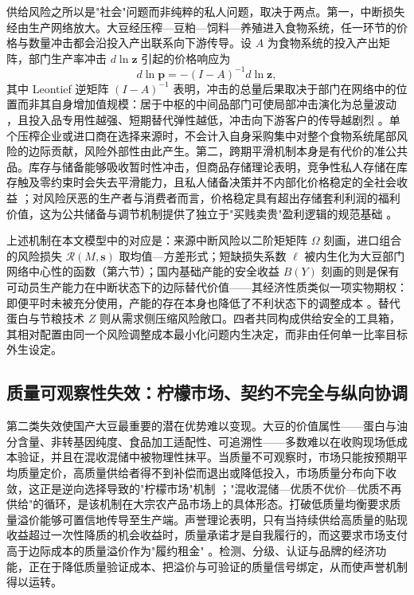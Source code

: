 \documentclass[UTF8,zihao=-4,fontset=fandol]{ctexart}
\numberwithin{equation}{section}
\theoremstyle{definition}
\theoremstyle{remark}
\begin{document}
供给风险之所以是"社会"问题而非纯粹的私人问题，取决于两点。第一，中断损失经由生产网络放大。大豆经压榨—豆粕—饲料—养殖进入食物系统，任一环节的价格与数量冲击都会沿投入产出联系向下游传导。设 $A$ 为食物系统的投入产出矩阵，部门生产率冲击 $d\ln \bm z$ 引起的价格响应为
\begin{equation}
 d\ln \bm p=-(I-A)^{-1}d\ln \bm z,
 \label{eq:IO}
\end{equation}
其中 Leontief 逆矩阵 $(I-A)^{-1}$ 表明，冲击的总量后果取决于部门在网络中的位置而非其自身增加值规模：居于中枢的中间品部门可使局部冲击演化为总量波动 \parencite{AcemogluEtAl2012}，且投入品专用性越强、短期替代弹性越低，冲击向下游客户的传导越剧烈 \parencite{BarrotSauvagnat2016}。单个压榨企业或进口商在选择来源时，不会计入自身采购集中对整个食物系统尾部风险的边际贡献，风险外部性由此产生。第二，跨期平滑机制本身是有代价的准公共品。库存与储备能够吸收暂时性冲击，但商品存储理论表明，竞争性私人存储在库存触及零约束时会失去平滑能力，且私人储备决策并不内部化价格稳定的全社会收益 \parencite{WilliamsWright1991}；对风险厌恶的生产者与消费者而言，价格稳定具有超出存储套利利润的福利价值，这为公共储备与调节机制提供了独立于"买贱卖贵"盈利逻辑的规范基础 \parencite{NewberyStiglitz1981}。

上述机制在本文模型中的对应是：来源中断风险以二阶矩矩阵 $\Omega$ 刻画，进口组合的风险损失 $\mathcal{R}(M,\bm s)$ 取均值—方差形式；短缺损失系数 $\ell$ 被内生化为大豆部门网络中心性的函数（第六节）；国内基础产能的安全收益 $B(Y)$ 刻画的则是保有可动员生产能力在中断状态下的边际替代价值——其经济性质类似一项实物期权：即便平时未被充分使用，产能的存在本身也降低了不利状态下的调整成本 \parencite{DixitPindyck1994}。替代蛋白与节粮技术 $Z$ 则从需求侧压缩风险敞口。四者共同构成供给安全的工具箱，其相对配置由同一个风险调整成本最小化问题内生决定，而非由任何单一比率目标外生设定。

\subsection{质量可观察性失效：柠檬市场、契约不完全与纵向协调}

第二类失效使国产大豆最重要的潜在优势难以变现。大豆的价值属性——蛋白与油分含量、非转基因纯度、食品加工适配性、可追溯性——多数难以在收购现场低成本验证，并且在混收混储中被物理性抹平。当质量不可观察时，市场只能按预期平均质量定价，高质量供给者得不到补偿而退出或降低投入，市场质量分布向下收敛，这正是逆向选择导致的"柠檬市场"机制 \parencite{Akerlof1970}；"混收混储—优质不优价—优质不再供给"的循环，是该机制在大宗农产品市场上的具体形态。打破低质量均衡要求质量溢价能够可置信地传导至生产端。声誉理论表明，只有当持续供给高质量的贴现收益超过一次性降质的机会收益时，质量承诺才是自我履行的，而这要求市场支付高于边际成本的质量溢价作为"履约租金" \parencite{KleinLeffler1981}。检测、分级、认证与品牌的经济功能，正在于降低质量验证成本、把溢价与可验证的质量信号绑定，从而使声誉机制得以运转。
\end{document}
